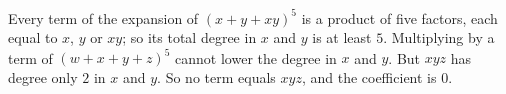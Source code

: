 Every term of the expansion of $(x+y+xy)^5$ is a product of five factors, each equal to $x$, $y$ or $xy$; so its total degree in $x$ and $y$ is at least $5$. Multiplying by a term of $(w+x+y+z)^5$ cannot lower the degree in $x$ and $y$. But $xyz$ has degree only $2$ in $x$ and $y$. So no term equals $xyz$, and the coefficient is $\boxed{0}$.
